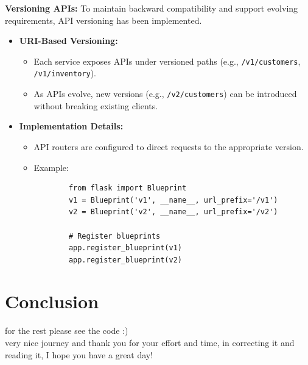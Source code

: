 \documentclass[a4paper,12pt]{article}
\begin{document}
\textbf{Versioning APIs:} To maintain backward compatibility and support evolving requirements, API versioning has been implemented.

\begin{itemize}
    \item \textbf{URI-Based Versioning:}
    \begin{itemize}
        \item Each service exposes APIs under versioned paths (e.g., \texttt{/v1/customers}, \texttt{/v1/inventory}).
        \item As APIs evolve, new versions (e.g., \texttt{/v2/customers}) can be introduced without breaking existing clients.
    \end{itemize}

    \item \textbf{Implementation Details:}
    \begin{itemize}
        \item API routers are configured to direct requests to the appropriate version.
        \item Example:
        \begin{verbatim}
        from flask import Blueprint
        v1 = Blueprint('v1', __name__, url_prefix='/v1')
        v2 = Blueprint('v2', __name__, url_prefix='/v2')

        # Register blueprints
        app.register_blueprint(v1)
        app.register_blueprint(v2)
        \end{verbatim}
    \end{itemize}
\end{itemize}

\section{Conclusion}
for the rest please see the code :) \\ 
very nice journey and thank you for your effort and time, in correcting it and reading it, I hope you have a great day!\\
\end{document}
